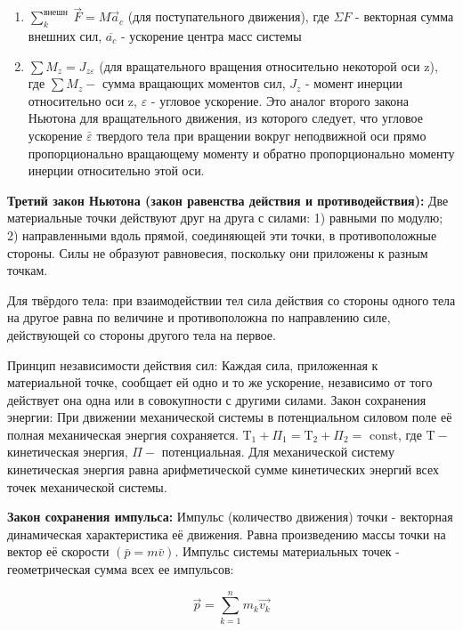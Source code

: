 \begin{enumerate}
  \item $\sum_{k}^{\text {внешн }} \vec{F}=M \vec{a}_{c}$ (для поступательного движения), где $\Sigma F$ - векторная сумма внешних сил, $\overline{a_{c}}$ - ускорение центра масс системы

  \item $\sum M_{z}=J_{z \varepsilon}$ (для вращательного вращения относительно некоторой оси z), где $\sum M_{z}-$ сумма вращающих моментов сил, $J_{z}$ - момент инерции относительно оси z, $\varepsilon$ - угловое ускорение. Это аналог второго закона Ньютона для вращательного движения, из которого следует, что угловое ускорение $\bar{\varepsilon}$ твердого тела при вращении вокруг неподвижной оси прямо пропорционально вращающему моменту и обратно пропорционально моменту инерции относительно этой оси.

\end{enumerate}

\textbf{Третий закон Ньютона (закон равенства действия и противодействия):}
Две материальные точки действуют друг на друга с силами: 1) равными по модулю; 2) направленными вдоль прямой, соединяющей эти точки, в противоположные стороны. Силы не образуют равновесия, поскольку они приложены к разным точкам.

Для твёрдого тела: при взаимодействии тел сила действия со стороны одного тела на другое равна по величине и противоположна по направлению силе, действующей со стороны другого тела на первое.

Принцип независимости действия сил: Каждая сила, приложенная к материальной точке, сообщает ей одно и то же ускорение, независимо от того действует она одна или в совокупности с другими силами. Закон сохранения энергии: При движении механической системы в потенциальном силовом поле её полная механическая энергия сохраняется. $\mathrm{T}_{1}+\Pi_{1}=\mathrm{T}_{2}+\Pi_{2}=$ const, где $\mathrm{T}-$ кинетическая энергия, $\Pi-$ потенциальная. Для механической систему кинетическая энергия равна арифметической сумме кинетических энергий всех точек механической системы.

\textbf{Закон сохранения импульса:} Импульс (количество движения) точки - векторная динамическая характеристика её движения. Равна произведению массы точки на вектор её скорости $(\bar{p}=m \bar{v})$. Импульс системы материальных точек - геометрическая сумма всех ее импульсов:

$$
\vec{p}=\sum_{k=1}^{n} m_{k} \overrightarrow{v_{k}}
$$

